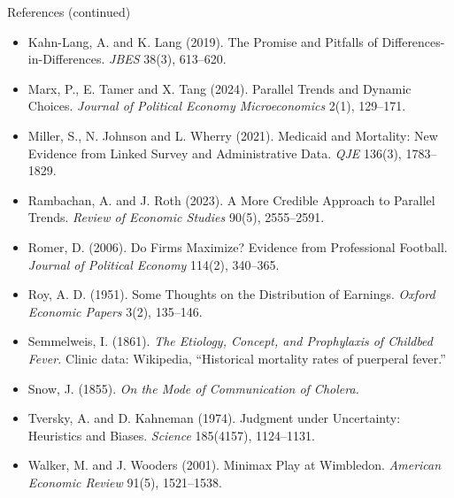 \documentclass[
  11pt,
  ignorenonframetext,
  aspectratio=169,
]{beamer}
\providecommand{\tightlist}{%
  \setlength{\itemsep}{0pt}\setlength{\parskip}{0pt}}
\begin{document}
\begin{frame}{References (continued)}
\protect{}\label{references-continued}
\tiny

\begin{itemize}
\tightlist
\item
  Kahn-Lang, A. and K. Lang (2019). The Promise and Pitfalls of
  Differences-in-Differences. \emph{JBES} 38(3), 613--620.
\item
  Marx, P., E. Tamer and X. Tang (2024). Parallel Trends and Dynamic
  Choices. \emph{Journal of Political Economy Microeconomics} 2(1),
  129--171.
\item
  Miller, S., N. Johnson and L. Wherry (2021). Medicaid and Mortality:
  New Evidence from Linked Survey and Administrative Data. \emph{QJE}
  136(3), 1783--1829.
\item
  Rambachan, A. and J. Roth (2023). A More Credible Approach to Parallel
  Trends. \emph{Review of Economic Studies} 90(5), 2555--2591.
\item
  Romer, D. (2006). Do Firms Maximize? Evidence from Professional
  Football. \emph{Journal of Political Economy} 114(2), 340--365.
\item
  Roy, A. D. (1951). Some Thoughts on the Distribution of Earnings.
  \emph{Oxford Economic Papers} 3(2), 135--146.
\item
  Semmelweis, I. (1861). \emph{The Etiology, Concept, and Prophylaxis of
  Childbed Fever.} Clinic data: Wikipedia, ``Historical mortality rates
  of puerperal fever.''
\item
  Snow, J. (1855). \emph{On the Mode of Communication of Cholera.}
\item
  Tversky, A. and D. Kahneman (1974). Judgment under Uncertainty:
  Heuristics and Biases. \emph{Science} 185(4157), 1124--1131.
\item
  Walker, M. and J. Wooders (2001). Minimax Play at Wimbledon.
  \emph{American Economic Review} 91(5), 1521--1538.
\end{itemize}
\end{frame}
\end{document}
